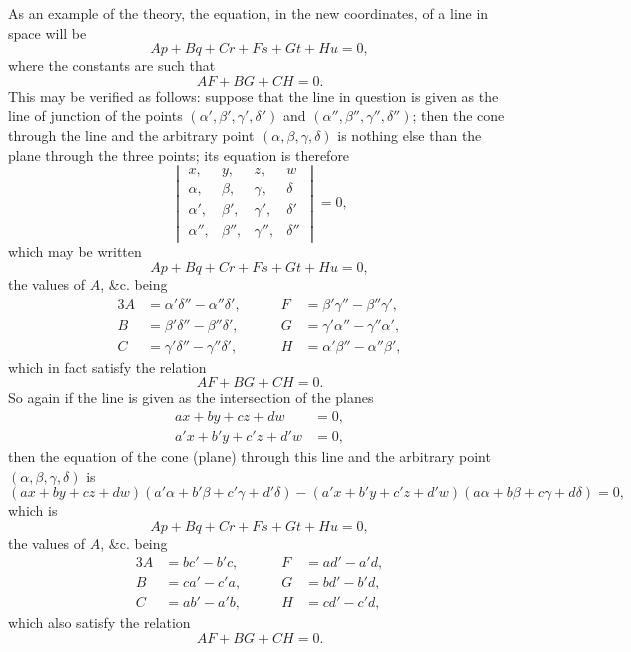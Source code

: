 \documentclass[11pt,a4paper]{article}
\theoremstyle{plain}
\begin{document}
As an example of the theory, the equation, in the new coordinates, of a line in space will be
\[
Ap + Bq + Cr + Fs + Gt + Hu = 0,
\]
where the constants are such that
\[
AF + BG + CH = 0.
\]
This may be verified as follows: suppose that the line in question is given as the line of junction of the points $(\alpha', \beta', \gamma', \delta')$ and $(\alpha'', \beta'', \gamma'', \delta'')$; then the cone through the line and the arbitrary point $(\alpha, \beta, \gamma, \delta)$ is nothing else than the plane through the three points; its equation is therefore
\[
\begin{vmatrix}
x, & y, & z, & w \\
\alpha, & \beta, & \gamma, & \delta \\
\alpha', & \beta', & \gamma', & \delta' \\
\alpha'', & \beta'', & \gamma'', & \delta''
\end{vmatrix} = 0,
\]
which may be written
\[
Ap + Bq + Cr + Fs + Gt + Hu = 0,
\]
the values of $A$, \&c. being
\begin{alignat*}{3}
A &= \alpha'\delta'' - \alpha''\delta', &\qquad F &= \beta'\gamma'' - \beta''\gamma',\\
B &= \beta'\delta'' - \beta''\delta', &\qquad G &= \gamma'\alpha'' - \gamma''\alpha',\\
C &= \gamma'\delta'' - \gamma''\delta', &\qquad H &= \alpha'\beta'' - \alpha''\beta',
\end{alignat*}
which in fact satisfy the relation
\[
AF + BG + CH = 0.
\]
So again if the line is given as the intersection of the planes
\begin{align*}
ax + by + cz + dw &= 0,\\
a'x + b'y + c'z + d'w &= 0,
\end{align*}
then the equation of the cone (plane) through this line and the arbitrary point $(\alpha, \beta, \gamma, \delta)$ is
\[
(ax + by + cz + dw)(a'\alpha + b'\beta + c'\gamma + d'\delta) - (a'x + b'y + c'z + d'w)(a\alpha + b\beta + c\gamma + d\delta) = 0,
\]
which is
\[
Ap + Bq + Cr + Fs + Gt + Hu = 0,
\]
the values of $A$, \&c. being
\begin{alignat*}{3}
A &= bc' - b'c, &\qquad F &= ad' - a'd,\\
B &= ca' - c'a, &\qquad G &= bd' - b'd,\\
C &= ab' - a'b, &\qquad H &= cd' - c'd,
\end{alignat*}
which also satisfy the relation
\[
AF + BG + CH = 0.
\]
\end{document}
